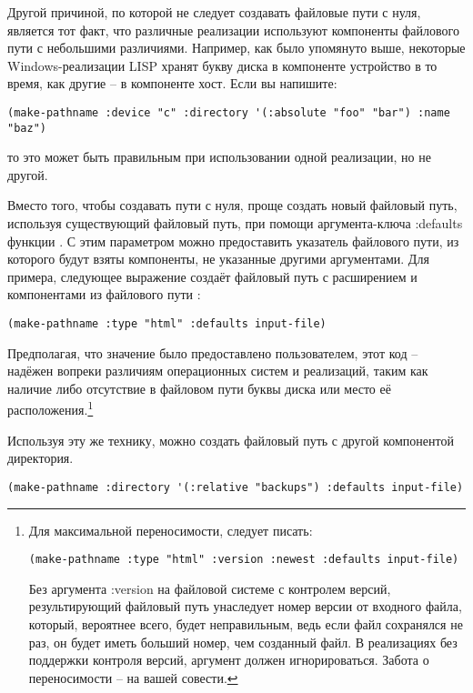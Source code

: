 Другой причиной, по которой не следует создавать файловые пути с нуля, является тот факт,
что различные реализации используют компоненты файлового пути с небольшими
различиями. Например, как было упомянуто выше, некоторые Windows-реализации LISP хранят
букву диска в компоненте устройство в то время, как другие -- в компоненте хост. Если вы
напишите:

\begin{lstlisting}
(make-pathname :device "c" :directory '(:absolute "foo" "bar") :name "baz") 
\end{lstlisting}

то это может быть правильным при использовании одной реализации, но не другой.

Вместо того, чтобы создавать пути с нуля, проще создать новый файловый путь, используя
существующий файловый путь, при помощи аргумента-ключа :defaults функции
. С этим параметром можно предоставить указатель файлового пути, из
которого будут взяты компоненты, не указанные другими аргументами. Для примера, следующее
выражение создаёт файловый путь с расширением  и компонентами из файлового
пути :

\begin{lstlisting}
(make-pathname :type "html" :defaults input-file) 
\end{lstlisting}

Предполагая, что значение  было предоставлено пользователем, этот код --
надёжен вопреки различиям операционных систем и реализаций, таким как наличие либо
отсутствие в файловом пути буквы диска или место её расположения.\footnote{Для
  максимальной переносимости, следует писать:

\begin{lstlisting}
(make-pathname :type "html" :version :newest :defaults input-file) 
\end{lstlisting}

Без аргумента :version на файловой системе с контролем версий, результирующий файловый
путь унаследует номер версии от входного файла, который, вероятнее всего, будет
неправильным, ведь если файл сохранялся не раз, он будет иметь больший номер, чем
созданный  файл. В реализациях без поддержки контроля версий, аргумент
 должен игнорироваться. Забота о переносимости -- на вашей совести.}

Используя эту же технику, можно создать файловый путь с другой компонентой директория.

\begin{lstlisting}
(make-pathname :directory '(:relative "backups") :defaults input-file) 
\end{lstlisting}


